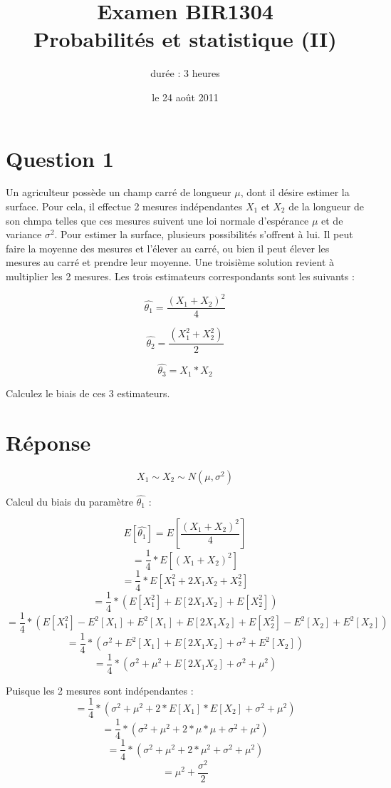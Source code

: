 \documentclass[a4paper, 12pt]{article}
\author{durée : 3 heures}
\title{Examen BIR1304 \\ Probabilités et statistique (II)}
\date{le 24 août 2011}
\begin{document}
\maketitle

  \color{black}
  \section*{Question 1}
  
  Un agriculteur possède un champ carré de longueur $\mu$, dont il désire estimer la surface. Pour cela, il effectue 2 mesures indépendantes $X_{1}$ et $X_{2}$ de la longueur de son chmpa telles que ces mesures suivent une loi normale d'espérance $\mu$ et de variance $\sigma^{2}$. Pour estimer la surface, plusieurs possibilités s'offrent à lui. Il peut faire la moyenne des mesures et l'élever au carré, ou bien il peut élever les mesures au carré et prendre leur moyenne. Une troisième solution revient à multiplier les 2 mesures. Les trois estimateurs correspondants sont les suivants :
  
  \[
   \hat{\theta_{1}} = \frac{(X_{1} + X_{2})^{2}}{4}
  \]

  \[
   \hat{\theta_{2}} = \frac{(X_{1}^{2} + X_{2}^{2})}{2}
  \]
  
  \[
   \hat{\theta_{3}} = X_{1} * X_{2}
  \] \bigskip
  
  Calculez le biais de ces 3 estimateurs.
  
  \color{red!70}
  \section*{Réponse}
  
  \[
   X_{1} \sim X_{2} \sim N (\mu, \sigma^{2})
  \] \bigskip
  
  Calcul du biais du paramètre $\hat{\theta_{1}}$ : 
  
  \[
   E[\hat{\theta_{1}}] = E[\frac{(X_{1} + X_{2})^{2}}{4}] 
  \]
  \[
   = \frac{1}{4} * E[(X_{1} + X_{2})^{2}]
  \]
  \[
   = \frac{1}{4} * E[X_{1}^{2} + 2 X_{1} X_{2} + X_{2}^{2}]
  \]
  \[
   = \frac{1}{4} * (E[X_{1}^{2}] + E[2 X_{1} X_{2}] + E[X_{2}^{2}])
  \]
  \[
   = \frac{1}{4} * (E[X_{1}^{2}] - E^{2}[X_{1}] + E^{2}[X_{1}] + E[2 X_{1} X_{2}] + E[X_{2}^{2}] - E^{2}[X_{2}] + E^{2}[X_{2}])
  \]
  \[
   = \frac{1}{4} * (\sigma^{2} + E^{2}[X_{1}] + E[2 X_{1} X_{2}] + \sigma^{2} + E^{2}[X_{2}])
  \]
  \[
   = \frac{1}{4} * (\sigma^{2} + \mu^{2} + E[2 X_{1} X_{2}] + \sigma^{2} + \mu^{2})
  \]
  
  Puisque les 2 mesures sont indépendantes :
  \[
   = \frac{1}{4} * (\sigma^{2} + \mu^{2} + 2* E[X_{1}] * E[X_{2}] + \sigma^{2} + \mu^{2})
  \]
  \[
   = \frac{1}{4} * (\sigma^{2} + \mu^{2} + 2* \mu * \mu + \sigma^{2} + \mu^{2})
  \]
  \[
   = \frac{1}{4} * (\sigma^{2} + \mu^{2} + 2* \mu^{2} + \sigma^{2} + \mu^{2})
  \]
  \[
   = \mu^{2} + \frac{\sigma^{2}}{2}
  \]
  
\end{document}
